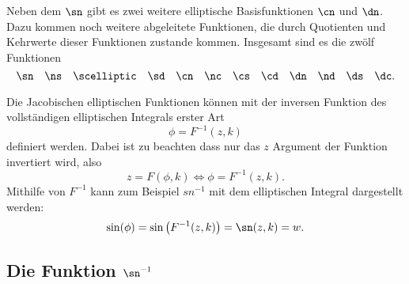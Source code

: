 Neben dem $\sn$ gibt es zwei weitere elliptische Basisfunktionen $\cn$ und $\dn$.
Dazu kommen noch weitere abgeleitete Funktionen, die durch Quotienten und Kehrwerte dieser Funktionen zustande kommen.
Insgesamt sind es die zwölf Funktionen
\begin{equation*}
    \sn \quad
    \ns \quad
    \scelliptic \quad
    \sd \quad
    \cn \quad
    \nc \quad
    \cs \quad
    \cd \quad
    \dn \quad
    \nd \quad
    \ds \quad
    \dc.
\end{equation*}

Die Jacobischen elliptischen Funktionen können mit der inversen Funktion des vollständigen elliptischen Integrals erster Art
\begin{equation}
    \phi = F^{-1}(z, k)
\end{equation}
definiert werden. Dabei ist zu beachten dass nur das $z$ Argument der Funktion invertiert wird, also
\begin{equation}
    z = F(\phi, k)
    \Leftrightarrow
    \phi = F^{-1}(z, k).
\end{equation}
Mithilfe von $F^{-1}$ kann zum Beispiel $sn^{-1}$ mit dem elliptischen Integral dargestellt werden:
\begin{equation}
    \sin(\phi)
    =
    \sin \left( F^{-1}(z, k) \right)
    =
    \sn(z, k)
    =
    w.
\end{equation}

\subsection{Die Funktion $\sn^{-1}$}

